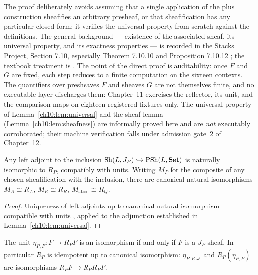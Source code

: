 \begin{remark}
\label{ch10:rem:stacks}
The proof deliberately avoids assuming that a single application of the plus
construction sheafifies an arbitrary presheaf, or that sheafification has any
particular closed form; it verifies the universal property from scratch
against the definitions. The general background --- existence of the
associated sheaf, its universal property, and its exactness properties --- is
recorded in the Stacks Project, Section 7.10, especially Theorem 7.10.10 and
Proposition 7.10.12 \cite{stacks00W1}; the textbook treatment is
\cite[Chapter~III]{maclane}. The point of the direct proof is auditability:
once $F$ and $G$ are fixed, each step reduces to a finite computation on the
sixteen contexts. The quantifiers over presheaves $F$ and sheaves $G$ are not
themselves finite, and no executable layer discharges them: Chapter~11
exercises the reflector, its unit, and the comparison maps on eighteen
registered fixtures only. The universal property of
Lemma~\ref{ch10:lem:universal} and the sheaf lemma
(Lemma~\ref{ch10:lem:sheafness}) are informally proved here and are \emph{not}
executably corroborated; their machine verification falls under admission
gate~2 of Chapter~12.
\end{remark}

\begin{corollary}
\label{ch10:cor:thereflector}
Any left adjoint to the inclusion $\mathrm{Sh}(L, J_P) \hookrightarrow \mathrm{PSh}(L, \mathbf{Set})$
is naturally isomorphic to $R_P$, compatibly with units. Writing $M_P$ for the
composite of any chosen sheafification with the inclusion, there are canonical
natural isomorphisms $M_A \cong R_A$, $M_R \cong R_R$,
$M_{\mathrm{atom}} \cong R_Q$.
\end{corollary}

\begin{proof}
Uniqueness of left adjoints up to canonical natural isomorphism compatible
with units \cite[Ch.~IV]{maclanecwm}, applied to the adjunction established in
Lemma~\ref{ch10:lem:universal}.
\end{proof}

\begin{corollary}
\label{ch10:cor:fixed}
The unit $\eta_{P, F} : F \to R_P F$ is an isomorphism if and only if $F$ is a
$J_P$-sheaf. In particular $R_P$ is idempotent up to canonical isomorphism:
$\eta_{P, R_P F}$ and $R_P(\eta_{P, F})$ are isomorphisms
$R_P F \to R_P R_P F$.
\end{corollary}

